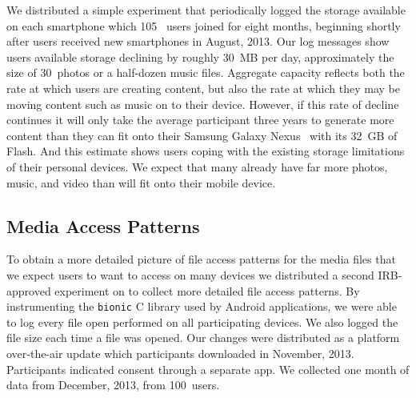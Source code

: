 We distributed a simple experiment that periodically logged the storage
available on each smartphone which 105~\PhoneLab{} users joined for eight
months, beginning shortly after \PhoneLab{} users received new smartphones in
August, 2013. Our log messages show users available storage declining by
roughly 30~MB per day, approximately the size of 30~photos or a half-dozen
music files. Aggregate capacity reflects both the rate at which users are
creating content, but also the rate at which they may be moving content such as
music on to their device. However, if this rate of decline continues it will
only take the average \PhoneLab{} participant three years to generate more
content than they can fit onto their Samsung Galaxy Nexus~\cite{galaxynexus}
with its 32~GB of Flash. And this estimate shows users coping with the existing
storage limitations of their personal devices. We expect that many already have
far more photos, music, and video than will fit onto their mobile device.

\subsection{Media Access Patterns}

To obtain a more detailed picture of file access patterns for the media files
that we expect users to want to access on many devices we distributed a
second IRB-approved experiment on \PhoneLab{} to collect more detailed file
access patterns. By instrumenting the \texttt{bionic} C library used by
Android applications, we were able to log every file open performed on all
participating devices. We also logged the file size each time a file was
opened. Our changes were distributed as a platform over-the-air update which
\PhoneLab{} participants downloaded in November, 2013. Participants indicated
consent through a separate app. We collected one month of data from December,
2013, from 100~users.

